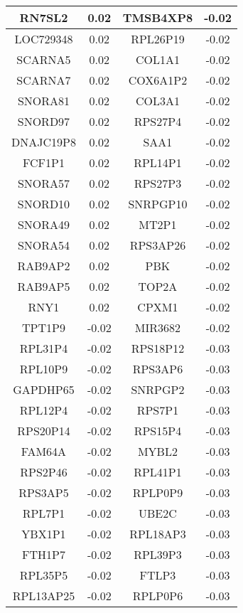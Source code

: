 \begin{longtable}{|c|c||c|c|}
		\hline
		RN7SL2 & 0.02 & TMSB4XP8 & -0.02 \\
		\hline
		LOC729348 & 0.02 & RPL26P19 & -0.02 \\
		\hline
		SCARNA5 & 0.02 & COL1A1 & -0.02 \\
		\hline
		SCARNA7 & 0.02 & COX6A1P2 & -0.02 \\
		\hline
		SNORA81 & 0.02 & COL3A1 & -0.02 \\
		\hline
		SNORD97 & 0.02 & RPS27P4 & -0.02 \\
		\hline
		DNAJC19P8 & 0.02 & SAA1 & -0.02 \\
		\hline
		FCF1P1 & 0.02 & RPL14P1 & -0.02 \\
		\hline
		SNORA57 & 0.02 & RPS27P3 & -0.02 \\
		\hline
		SNORD10 & 0.02 & SNRPGP10 & -0.02 \\
		\hline
		SNORA49 & 0.02 & MT2P1 & -0.02 \\
		\hline
		SNORA54 & 0.02 & RPS3AP26 & -0.02 \\
		\hline
		RAB9AP2 & 0.02 & PBK & -0.02 \\
		\hline
		RAB9AP5 & 0.02 & TOP2A & -0.02 \\
		\hline
		RNY1 & 0.02 & CPXM1 & -0.02 \\
		\hline
		TPT1P9 & -0.02 & MIR3682 & -0.02 \\
		\hline
		RPL31P4 & -0.02 & RPS18P12 & -0.03 \\
		\hline
		RPL10P9 & -0.02 & RPS3AP6 & -0.03 \\
		\hline
		GAPDHP65 & -0.02 & SNRPGP2 & -0.03 \\
		\hline
		RPL12P4 & -0.02 & RPS7P1 & -0.03 \\
		\hline
		RPS20P14 & -0.02 & RPS15P4 & -0.03 \\
		\hline
		FAM64A & -0.02 & MYBL2 & -0.03 \\
		\hline
		RPS2P46 & -0.02 & RPL41P1 & -0.03 \\
		\hline
		RPS3AP5 & -0.02 & RPLP0P9 & -0.03 \\
		\hline
		RPL7P1 & -0.02 & UBE2C & -0.03 \\
		\hline
		YBX1P1 & -0.02 & RPL18AP3 & -0.03 \\
		\hline
		FTH1P7 & -0.02 & RPL39P3 & -0.03 \\
		\hline
		RPL35P5 & -0.02 & FTLP3 & -0.03 \\
		\hline
		RPL13AP25 & -0.02 & RPLP0P6 & -0.03 \\
		\hline
		
	\end{longtable}
